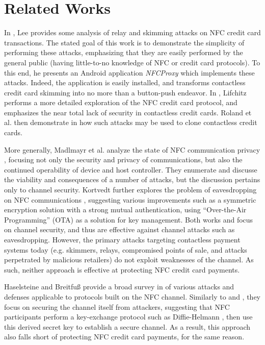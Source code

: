 \section{Related Works}
\label{sec:related}


In \cite{lee2012nfc}, Lee provides some analysis of relay and skimming attacks on NFC credit card transactions.
The stated goal of this work is to demonstrate the simplicity of performing these attacks,
    emphasizing that they are easily performed by the general public (having little-to-no knowledge of NFC or credit card protocols).
To this end, he presents an Android application \emph{NFCProxy} \cite{NFCProxy} which implements these attacks.
Indeed, the application is easily installed, and transforms contactless credit card skimming into no more than a button-push endeavor.
In \cite{lifchitz2012hacking}, Lifchitz performs a more detailed exploration of the NFC credit card protocol, and emphasizes the near total lack of security in contactless credit cards.
Roland et al. then demonstrate in \cite{roland2013cloning} how such attacks may be used to clone contactless credit cards.

More generally, Madlmayr et al. analyze the state of NFC communication privacy \cite{madlmayr2008nfc},
    focusing not only the security and privacy of communications, but also the continued operability of device and host controller.
They enumerate and discusse the viability and consequences of a number of attacks, but the discussion pertains only to channel security.
Kortvedt further explores the problem of eavesdropping on NFC communications \cite{kortvedt2009securing},
    suggesting various improvements such as a symmetric encryption solution with a strong mutual authentication,
    using ``Over-the-Air Programming'' (OTA) as a solution for key management.
Both works \cite{kortvedt2009securing} and \cite{madlmayr2008nfc} focus on channel security, and thus are effective against channel attacks such as eavesdropping.
However, the primary attacks targeting contactless payment systems today
    (e.g. skimmers, relays, compromised points of sale, and attacks perpetrated by malicious retailers) do not exploit weaknesses of the channel.
As such, neither approach is effective at protecting NFC credit card payments.

Haselsteine and Breitfu{\ss} provide a broad survey in \cite{haselsteiner2006security} of various attacks and defenses applicable to protocols built on the NFC channel.
Similarly to \cite{madlmayr2008nfc} and \cite{kortvedt2009securing}, they focus on securing the channel itself from attackers,
    suggesting that NFC participants perform a key-exchange protocol such as Diffie-Helmann \cite{diffiehellman},
    then use this derived secret key to establish a secure channel.
As a result, this approach also falls short of protecting NFC credit card payments, for the same reason.

